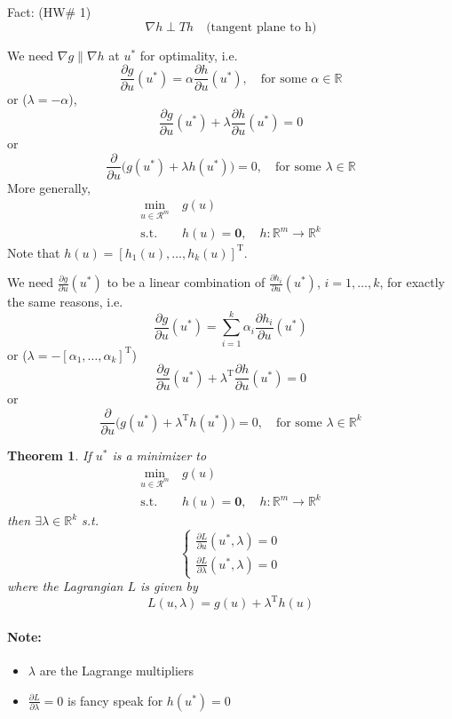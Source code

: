\documentclass[letterpaper,12pt,titlepage]{report}
\newcommand{\trans}{^\text{T}}
\newcommand*\pder[2]{\frac{\partial #1}{\partial #2}}
\newcommand*\R{\mathbb{R}}
\theoremstyle{plain}
\newtheorem*{thm}{Theorem}
\theoremstyle{definition}
\begin{document}
\medskip
Fact: (HW\# 1)
\[ \nabla h \perp Th \quad \text{(tangent plane to h)} \]
\begin{center}
\end{center}
We need $\nabla g \parallel \nabla h$ at $u^*$ for optimality, i.e.
\[ \pder{g}{u}(u^*) = \alpha \pder{h}{u}(u^*), \quad \text{for some } \alpha\in\R \]
or ($\lambda=-\alpha$),
\[ \pder{g}{u}(u^*) + \lambda \pder{h}{u}(u^*) = 0 \]
or
\[ \pder{}{u} \big( g(u^*) + \lambda h(u^*) \big) = 0, \quad \text{for some } \lambda\in\R \]
More generally,
\begin{align}
  \min_{u\in\mathcal R^m} {}\ & g(u) \\
  \text{s.t. } & h(u)=\bm 0, \quad h:\R^m\to\R^k
\end{align}
Note that $h(u)=[h_1(u),\dots,h_k(u)]\trans$.

We need $\pder{g}{u}(u^*)$ to be a linear combination of $\pder{h_i}{u}(u^*)$, $i=1,\dots,k$, for exactly the same reasons, i.e.
\[ \pder{g}{u}(u^*) = \sum_{i=1}^k \alpha_i \pder{h_i}{u}(u^*) \]
or ($\lambda=-[\alpha_1,\dots,\alpha_k]\trans$)
\[ \pder{g}{u}(u^*) + \lambda\trans \pder{h}{u}(u^*) = 0 \]
or
\[ \pder{}{u} \big( g(u^*) + \lambda\trans h(u^*) \big) = 0, \quad \text{for some } \lambda\in\R^k \]

\begin{thm}
  If $u^*$ is a minimizer to 
  \begin{align}
    \min_{u\in\mathcal R^m} {}\ & g(u) \\
    \text{s.t. } & h(u)=\bm 0, \quad h:\R^m\to\R^k
  \end{align}
  then $\exists\lambda\in\R^k$ s.t.
  \[ \begin{cases}
      \displaystyle \pder{L}{u}(u^*,\lambda) = 0 \\[2ex]
      \displaystyle \pder{L}{\lambda}(u^*,\lambda) = 0
    \end{cases} \]
  where the Lagrangian $L$ is given by
  \[ L(u,\lambda) = g(u) + \lambda\trans h(u) \]
\end{thm}

\paragraph{Note:}
\begin{itemize}
\item $\lambda$ are the Lagrange multipliers
\item $\pder{L}{\lambda}=0$ is fancy speak for $h(u^*)=0$
\end{itemize}
\end{document}
